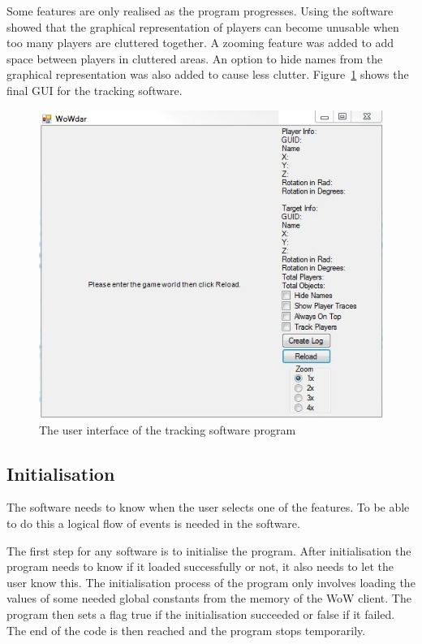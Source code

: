 Some features are only realised as the program progresses. Using the software showed that the graphical representation of players can become unusable when too many players are cluttered together. A zooming feature was added to add space between players in cluttered areas. An option to hide names from the graphical representation was also added to cause less clutter. Figure~\ref{wowdar1} shows the final GUI for the tracking software.

\begin{figure}[htbp]  %
\centering
\includegraphics[scale = 0.65]{wowdar.jpg}	
\caption{The user interface of the tracking software program}
\label{wowdar1}
\end{figure}

\subsection{Initialisation}

The software needs to know when the user selects one of the features. To be able to do this a logical flow of events is needed in the software.

The first step for any software is to initialise the program. After initialisation the program needs to know if it loaded successfully or not, it also needs to let the user know this. The initialisation process of the program only involves loading the values of some needed global constants from the memory of the WoW client. The program then sets a flag true if the initialisation succeeded or false if it failed. The end of the code is then reached and the program stops temporarily.

